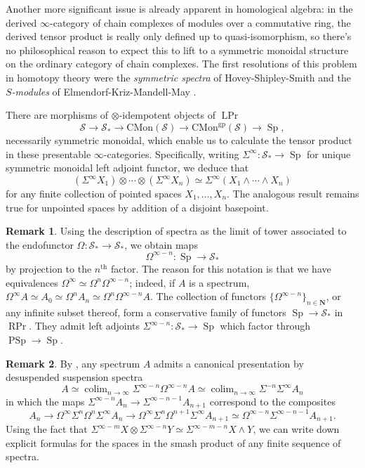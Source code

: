 \documentclass{article}
\theoremstyle{definition}
\newtheorem{remark}{Remark}[subsection]
\renewcommand{\S}{\mathcal{S}}
\newcommand{\NN}{\mathbf{N}}
\renewcommand{\i}{\infty}
\newcommand{\too}{\longrightarrow}
\DeclareMathOperator{\colim}{colim}
\DeclareMathOperator{\Prl}{LPr}
\DeclareMathOperator{\PrR}{RPr}
\DeclareMathOperator{\PSp}{PSp}
\DeclareMathOperator{\Sp}{Sp}
\newcommand{\CMon}{\mathrm{CMon}}
\begin{document}
Another more significant issue is already apparent in homological algebra: in the derived $\i$-category of chain complexes of modules over a commutative ring, the derived tensor product is really only defined up to quasi-isomorphism, so there's no philosophical reason to expect this to lift to a symmetric monoidal structure on the ordinary category of chain complexes.
The first resolutions of this problem in homotopy theory were the {\em symmetric spectra} of Hovey-Shipley-Smith \cite{HSS} and the {\em $S$-modules} of Elmendorf-Kriz-Mandell-May \cite{EKMM}. 


There are morphisms of $\otimes$-idempotent objects of $\Prl$
\[
\S\too\S_*\too\CMon(\S)\too\CMon^\mathrm{gp}(\S)\too\Sp,
\]
necessarily symmetric monoidal, which enable us to calculate the tensor product in these presentable $\infty$-categories.
Specifically, writing $\Sigma^\infty:\S_*\to\Sp$\index{$\Sigma^\infty$} for unique symmetric monoidal left adjoint functor, we deduce that
\[
(\Sigma^\infty X_1)\otimes\cdots\otimes(\Sigma^\infty X_n)\simeq \Sigma^\infty(X_1\land\cdots\land X_n)
\]
for any finite collection of pointed spaces $X_1,\ldots,X_n$.
The analogous result remains true for unpointed spaces by addition of a disjoint basepoint.
\begin{remark}
Using the description of spectra as the limit of tower associated to the endofunctor $\Omega:\S_*\to\S_*$, we obtain maps
\[
\Omega^{\infty-n}:\Sp\too\S_*
\]
by projection to the $n^\mathrm{th}$ factor.
The reason for this notation is that we have equivalences $\Omega^\infty\simeq\Omega^n\Omega^{\infty-n}$; indeed, if $A$ is a spectrum, $\Omega^\infty A\simeq A_0\simeq\Omega^n A_n\simeq\Omega^n\Omega^{\infty-n}A$.
The collection of functors $\{\Omega^{\infty-n}\}_{n\in\NN}$, or any infinite subset thereof, form a conservative family of functors $\Sp\to\S_*$ in $\PrR$.
They admit left adjoints $\Sigma^{\infty-n}:\S_*\to\Sp$ which factor through $\PSp\to\Sp$.
\end{remark}
\begin{remark}
By \cite[Proposition 6.3.3.6]{HTT}, any spectrum $A$ admits a canonical presentation by desuspended suspension spectra
\[
A\simeq\colim_{n\to\infty}\Sigma^{\infty-n}\Omega^{\infty-n}A\simeq\colim_{n\to\infty}\Sigma^{-n}\Sigma^\i A_n
\]
in which the maps $\Sigma^{\infty-n} A_n\to\Sigma^{\infty-n-1} A_{n+1}$ correspond to the composites
\[
A_n\to\Omega^{\infty}\Sigma^n\Omega^n\Sigma^{\infty} A_{n}
\to\Omega^{\infty}\Sigma^n\Omega^{n+1}\Sigma^{\infty}A_{n+1}\simeq\Omega^{\infty-n}\Sigma^{\infty-n-1}A_{n+1}.
\]
Using the fact that $\Sigma^{\infty-m}X\otimes\Sigma^{\infty-n}Y\simeq\Sigma^{\infty-m-n}X\land Y$, we can write down explicit formulas for the spaces in the smash product of any finite sequence of spectra.
\end{remark}
\end{document}
